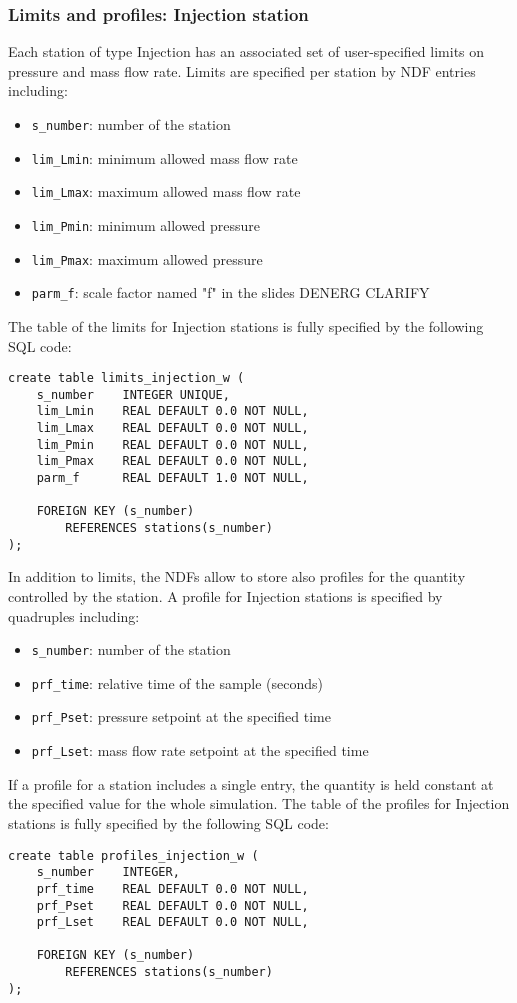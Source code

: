 \subsubsection{Limits and profiles: Injection station}
Each station of type Injection has an associated set of user-specified limits on pressure
and mass flow rate. Limits are specified per station by NDF entries including:
\begin{itemize}
    \item \texttt{s\_number}:   number of the station
    \item \texttt{lim\_Lmin}:   minimum allowed mass flow rate
    \item \texttt{lim\_Lmax}:   maximum allowed mass flow rate
    \item \texttt{lim\_Pmin}:   minimum allowed pressure
    \item \texttt{lim\_Pmax}:   maximum allowed pressure
    \item \texttt{parm\_f}:     scale factor named "f" in the slides DENERG CLARIFY
\end{itemize}
The table of the limits for Injection stations is fully specified by the following SQL code:
\begin{verbatim}
create table limits_injection_w (
    s_number    INTEGER UNIQUE,
    lim_Lmin    REAL DEFAULT 0.0 NOT NULL,
    lim_Lmax    REAL DEFAULT 0.0 NOT NULL,
    lim_Pmin    REAL DEFAULT 0.0 NOT NULL,
    lim_Pmax    REAL DEFAULT 0.0 NOT NULL,
    parm_f      REAL DEFAULT 1.0 NOT NULL,

    FOREIGN KEY (s_number)
        REFERENCES stations(s_number)
);
\end{verbatim}
In addition to limits, the NDFs allow to store also profiles for the quantity
controlled by the station. A profile for Injection stations is specified by quadruples including:
\begin{itemize}
    \item \texttt{s\_number}:   number of the station
    \item \texttt{prf\_time}:   relative time of the sample (seconds)
    \item \texttt{prf\_Pset}:   pressure setpoint at the specified time
    \item \texttt{prf\_Lset}:   mass flow rate setpoint at the specified time
\end{itemize}
If a profile for a station includes a single entry, the quantity is held constant
at the specified value for the whole simulation. The table of the profiles for
Injection stations is fully specified by the following SQL code:
\begin{verbatim}
create table profiles_injection_w (
    s_number    INTEGER,
    prf_time    REAL DEFAULT 0.0 NOT NULL,
    prf_Pset    REAL DEFAULT 0.0 NOT NULL,
    prf_Lset    REAL DEFAULT 0.0 NOT NULL,

    FOREIGN KEY (s_number)
        REFERENCES stations(s_number)
);
\end{verbatim}

